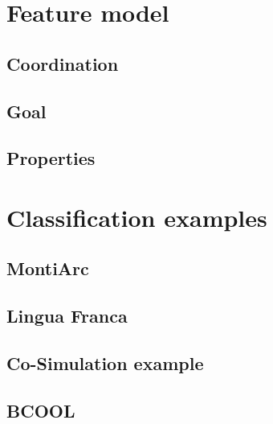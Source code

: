 \documentclass[runningheads]{llncs}
\begin{document}

\cite{gomesCoSimulationSurvey2019}



\section{Feature model} \label{sec:features}

\subsection{Coordination}
\subsection{Goal}
\subsection{Properties}

\section{Classification examples} \label{sec:classifications}

\subsection{MontiArc} %
\subsection{Lingua Franca} %
\subsection{Co-Simulation example} %
\subsection{BCOOL} %
\end{document}
